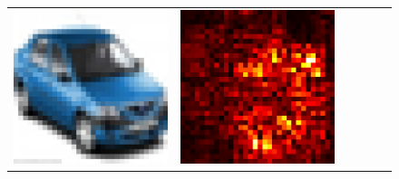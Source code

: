 \documentclass[preprint,12pt]{elsarticle}
\begin{document}
\begin{figure}[p]
\begin{tabular}{cccccc}
  \includegraphics[scale=\scale]{../visualizations/examples/cifar10/cnn/images/1.png} &
  \includegraphics[scale=\scale]{../visualizations/examples/cifar10/cnn/saliency_map/1.png} & 

\end{tabular}
\end{figure}
\end{document}
